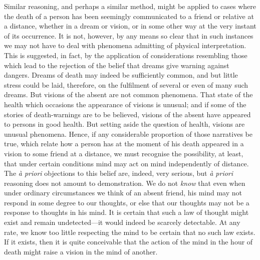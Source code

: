 \documentclass[letterpaper,12pt,oneside,openany]{memoir}
\begin{document}
Similar reasoning, and perhaps a similar method,
might be applied to cases where the death of a person
has been seemingly communicated to a friend or
relative at a distance, whether in a dream or vision,
or in some other way at the very instant of its
occurrence. It is not, however, by any means so clear
that in such instances we may not have to deal with
phenomena admitting of physical interpretation. This
is suggested, in fact, by the application of considerations
resembling those which lead to the rejection of
the belief that dreams give warning against dangers.
Dreams of death may indeed be sufficiently common,
and but little stress could be laid, therefore, on the
fulfilment of several or even of many such dreams.
But visions of the absent are not common phenomena.
That state of the health which occasions the appearance
of visions is unusual; and if some of the stories
of death-warnings are to be believed, visions of the
absent have appeared to persons in good health. But
setting aside the question of health, visions are unusual
phenomena. Hence, if any considerable proportion of
those narratives be true, which relate how a person has
at the moment of his death appeared in a vision to
some friend at a distance, we must recognise the possibility,
at least, that under certain conditions mind may
act on mind independently of distance. The \textit{\`a priori}
objections to this belief are, indeed, very serious, but
\textit{\`a priori} reasoning does not amount to demonstration.
We do not \emph{know} that even when under ordinary
circumstances we think of an absent friend, his mind
may not respond in some degree to our thoughts, or
else that our thoughts may not be a response to
thoughts in his mind. It is certain that such a law of
thought might exist and remain undetected---it would
indeed be scarcely detectable. At any rate, we know
too little respecting the mind to be certain that no
such law exists. If it exists, then it is quite conceivable
that the action of the mind in the hour of
death might raise a vision in the mind of another.
\end{document}
